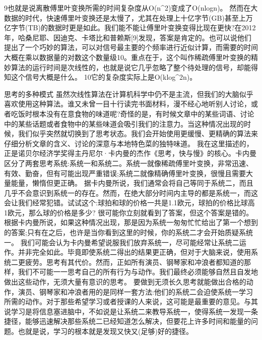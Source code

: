 9也就是说离散傅里叶变换所需的时间复杂度从O(n^2)变成了O(nlogn)。
然而在大数据的时代，快速傅里叶变换还是太慢了，尤其在处理上十亿字节(GB)甚至上万亿字节(TB)的数据时更是如此。我们能不能让傅里叶变换变得比现在更快?在2012年，哈桑尼耶、因迪克、卡塔比和普赖斯[9]发现，答案是肯定的。也可以说他们提出了一个巧妙的算法，可以对信号最主要的个频率进行近似计算，而需要的时间大概在乘以数据量的对数这个数量级10。重点在于，这个叫作稀疏傅里叶变换的精妙算法的运行时间是次线性的，也就是说它几乎忽略了整个待处理的信号，却能得知这个信号大概是什么。
10它的复杂度实际上是O(klog^2n)。

思考的多种模式
虽然次线性算法在计算机科学中仍不是主流，但我们的大脑似乎喜欢使用这种算法。谁又未曾一目十行读完书面材料，漫不经心地听别人讨论，或者吃饭时根本没有在意食物的味道呢?奇怪的是，有时候文章中的某些词语、讨论中的某些话题或者食物中的某些味道会吸引我们的注意力。当这种情况出现的时候，我们似乎突然就切换到了思考状态。我们会开始使用更缓慢、更精确的算法来仔细分析文章的含义、讨论的深意与本地特色菜的独特味道。
我在这里描述的，正是诺贝尔经济学奖得主丹尼尔·卡内曼的杰作《思考，快与慢》的核心。卡内曼区分了两套思考系统:系统一和系统二。系统一就像稀疏傅里叶变换，非常迅速、有效、勤奋，但有可能出现严重错误;系统二就像精确傅里叶变换，很慢且需要大量能量，懒惰但更正确。
据卡内曼所说，我们通常会将自己等同于系统二，而且几乎不会意识到系统一的存在。然而，在绝大部分时间内主导的都是系统一，而这会让我们经常犯错。试试这个:球拍和球的价格一共是1.1欧元，球拍的价格比球高1欧元，那么球的价格是多少?
很可能你立刻就看到了答案，但这个答案是错的。根据卡内曼所说，如果这种情况出现，那是因为系统一匆匆忙忙给出了第一个想到的答案;只有在之后，也许是当你看到这里的时候，你的系统二才会开始质疑系统一。
我们可能会认为卡内曼希望说服我们放弃系统一，尽可能经常让系统二运作。并非完全如此。毕竟即使系统二得出的结果更正确，但对于大脑来说，使用系统二更疲劳。思考有其代价。然而，正如所有演员、钢琴家和冲浪者都知道的那样，我们不可能一一思考自己的所有行为与动作。我们最终必须能够自然且自发地做出这些动作，无须大量有意识的思考。
要做到无须长久思考就能做出合格的动作，演员、钢琴家和冲浪者用的是同样一套方法:他们的系统二会迫使系统一学习所需的动作。对于那些希望学习或者授课的人来说，这可能是最重要的意见。与其说学习是将信息塞进脑中，不如说是让系统二来教导系统一，使得系统一发现一条捷径，能够迅速解决那些系统二已经知道怎么解决，但要花上许多时间和能量的问题。也就是说，学习的根本就是发现又快又(足够)好的捷径。

